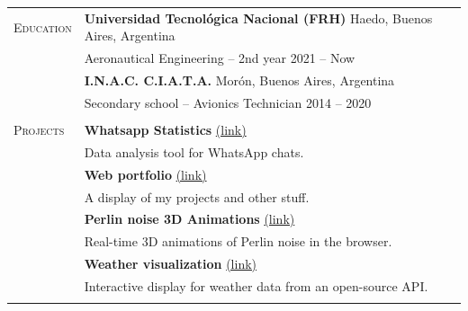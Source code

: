 \documentclass[11pt]{article}
\begin{document}
\vspace{0.5\baselineskip}\noindent
\renewcommand{\arraystretch}{1}%
\begin{tabular}[t]{@{}p{30mm} @{}p{150mm}}

   {\scshape Education}
                      &
   \textbf{Universidad Tecnológica Nacional (FRH)}  \hfill Haedo, Buenos Aires, Argentina\vspace{0.015in}                                                                       \\ &
   Aeronautical Engineering -- 2nd year \hfill 2021 -- Now\vspace{0.015in}
   \vspace{0.7\baselineskip}
   \\
                      & \textbf{I.N.A.C. C.I.A.T.A.}  \hfill Morón, Buenos Aires, Argentina\vspace{0.015in}                                                                     \\ &
   Secondary school -- Avionics Technician \hfill 2014 -- 2020\vspace{0.015in}
   \\
                      &
   \vspace{.3\baselineskip}
   {\noindent\hspace{-50mm}\hrulefill}
   \vspace{.7\baselineskip}
   \\



   {\scshape Projects}
                      &
   \textbf{Whatsapp Statistics} \href{https://damiponce.github.io/chat-analyser/}{\small(link)}
   \\
                      &
   Data analysis tool for WhatsApp chats.
   \vspace{0.7\baselineskip}
   \\
                      & \textbf{Web portfolio} \href{https://damiponce.github.io/}{\small(link)}
   \\
                      & A display of my projects and other stuff.
   \vspace{0.7\baselineskip}
   \\
                      & \textbf{Perlin noise 3D Animations} \href{https://damiponce.github.io/3d-noise/}{\small(link)}
   \\
                      & Real-time 3D animations of Perlin noise in the browser.
   \vspace{0.7\baselineskip}
   \\
                      & \textbf{Weather visualization} \href{https://damiponce.github.io/weather-web/}{\small(link)}
   \\
                      & Interactive display for weather data from an open-source API.
   \\
                      &
   \vspace{.3\baselineskip}
   {\noindent\hspace{-50mm}\hrulefill}
   \vspace{.7\baselineskip}
   \\


\end{tabular}
\end{document}
